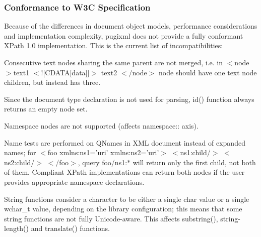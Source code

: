  \hypertarget{XMLManual_XMLXPathStandards}{}\subsubsection{Conformance to W3C Specification}\label{XMLManual_XMLXPathStandards}
Because of the differences in document object models, performance considerations and implementation complexity, pugixml does not provide a fully conformant XPath 1.0 implementation. This is the current list of incompatibilities:
\begin{DoxyItemize}
\item Consecutive text nodes sharing the same parent are not merged, i.e. in $<$node$>$text1 $<$!\mbox{[}CDATA\mbox{[}data\mbox{]}\mbox{]}$>$ text2 $<$/node$>$ node should have one text node children, but instead has three.
\item Since the document type declaration is not used for parsing, id() function always returns an empty node set.
\item Namespace nodes are not supported (affects namespace:: axis).
\item Name tests are performed on QNames in XML document instead of expanded names; for $<$foo xmlns:ns1='uri' xmlns:ns2='uri'$>$ $<$ns1:child/$>$ $<$ns2:child/$>$ $<$/foo$>$, query foo/ns1:$\ast$ will return only the first child, not both of them. Compliant XPath implementations can return both nodes if the user provides appropriate namespace declarations.
\item String functions consider a character to be either a single char value or a single wchar\_\-t value, depending on the library configuration; this means that some string functions are not fully Unicode-\/aware. This affects substring(), string-\/length() and translate() functions. 
\end{DoxyItemize}